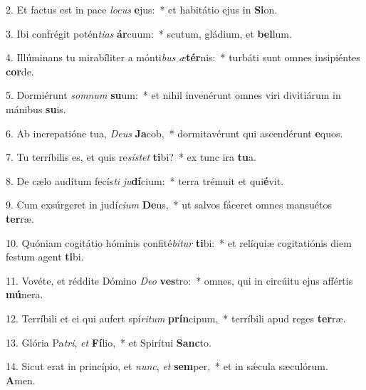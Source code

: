 2. Et factus est in pace \textit{lo}\textit{cus} \textbf{e}jus:~*  et habitátio ejus in \textbf{Si}on.\

3. Ibi confrégit potén\textit{ti}\textit{as} \textbf{ár}cuum:~*  scutum, gládium, et \textbf{bel}lum.\

4. Illúminans tu mirabíliter a mónti\textit{bus} \textit{æ}\textbf{tér}nis:~*  turbáti sunt omnes insipiéntes \textbf{cor}de.\

5. Dormiérunt \textit{som}\textit{num} \textbf{su}um:~*  et nihil invenérunt omnes viri divitiárum in mánibus \textbf{su}is.\

6. Ab increpatióne tua, \textit{De}\textit{us} \textbf{Ja}cob,~*  dormitavérunt qui ascendérunt \textbf{e}quos.\

7. Tu terríbilis es, et quis re\textit{sís}\textit{tet} \textbf{ti}bi?~*  ex tunc ira \textbf{tu}a.\

8. De cælo audítum fecís\textit{ti} \textit{ju}\textbf{dí}cium:~*  terra trémuit et qui\textbf{é}vit.\

9. Cum exsúrgeret in judí\textit{ci}\textit{um} \textbf{De}us,~*  ut salvos fáceret omnes mansuétos \textbf{ter}ræ.\

10. Quóniam cogitátio hóminis confité\textit{bi}\textit{tur} \textbf{ti}bi:~*  et relíquiæ cogitatiónis diem festum agent \textbf{ti}bi.\

11. Vovéte, et réddite Dómino \textit{De}\textit{o} \textbf{ves}tro:~*  omnes, qui in circúitu ejus affértis \textbf{mú}nera.\

12. Terríbili et ei qui aufert spí\textit{ri}\textit{tum} \textbf{prín}cipum,~*  terríbili apud reges \textbf{ter}ræ.\

13. Glória Pa\textit{tri}, \textit{et} \textbf{Fí}lio,~*  et Spirítui \textbf{Sanc}to.\

14. Sicut erat in princípio, et \textit{nunc}, \textit{et} \textbf{sem}per,~*  et in sǽcula sæculórum. \textbf{A}men.\

